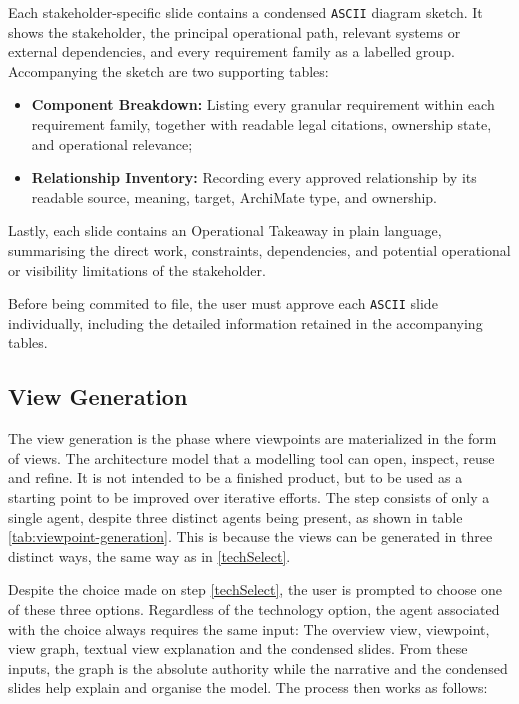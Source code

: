 Each stakeholder-specific slide contains a condensed \texttt{ASCII} diagram sketch. It shows the stakeholder, the principal operational path, relevant systems or external dependencies, and every requirement family as a labelled group. Accompanying the sketch are two supporting tables:
\begin{itemize}
    \item \textbf{Component Breakdown:} Listing every granular requirement within each requirement family, together with readable legal citations, ownership state, and operational relevance;
    \item \textbf{Relationship Inventory:} Recording every approved relationship by its readable source, meaning, target, ArchiMate type, and ownership.
\end{itemize}
Lastly, each slide contains an Operational Takeaway in plain language, summarising the direct work, constraints, dependencies, and potential operational or visibility limitations of the stakeholder.

Before being commited to file, the user must approve each \texttt{ASCII} slide individually, including the detailed information retained in the accompanying tables.

\subsection{View Generation}

The view generation is the phase where viewpoints are materialized in the form of views. The architecture model that a modelling tool can open, inspect, reuse and refine. It is not intended to be a finished product, but to be used as a starting point to be improved over iterative efforts. The step consists of only a single agent, despite three distinct agents being present, as shown in table \ref{tab:viewpoint-generation}. This is because the views can be generated in three distinct ways, the same way as in \ref{techSelect}.

Despite the choice made on step \ref{techSelect}, the user is prompted to choose one of these three options. Regardless of the technology option, the agent associated with the choice always requires the same input:
The overview view, viewpoint, view graph, textual view explanation and the condensed slides.
From these inputs, the graph is the absolute authority while the narrative and the condensed slides help explain and organise the model.
The process then works as follows:

